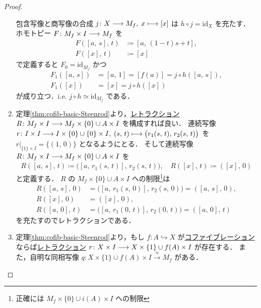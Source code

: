 \documentclass[algtopo_main]{subfiles}
\begin{document}
\begin{proof}
\begin{enumerate}
        包含写像と商写像の合成 $j \colon X \longrightarrow M_f,\; x \longmapsto [x]$ は $h \circ j = \mathrm{id}_X$ を充たす．
        ホモトピー $F \colon M_f \times I \longrightarrow M_f$ を
        \begin{align}
            F([a,\, s],\, t) &\coloneqq [a,\, (1-t)s + t], \\
            F([x],\, t) &\coloneqq [x]
        \end{align}
        で定義すると $F_0 = \mathrm{id}_{M_f}$ かつ
        \begin{align}
            F_1 ([a,\, s]) &= [a,\, 1] = [f(a)] = j \circ h ([a,\, s]), \\
            F_1 ([x]) &= [x] = j \circ h ([x])
        \end{align}
        が成り立つ．i.e. $j \circ h \simeq \mathrm{id}_{M_f}$ である．
        \item 定理\ref{thm:cofib-basic-Steenrod}より，\hyperref[def:retract]{レトラクション} $R \colon M_f \times I \longrightarrow M_f \times \{0\} \cup A \times I$ を構成すれば良い．
        連続写像 $r \colon I \times I \longrightarrow I \times \{0\} \cup \{0\} \times I,\; (s,\, t) \longmapsto \bigl( r_1(s,\, t),\, r_2(s,\, t) \bigr)$ を $r|_{\{1\} \times I} = \{(1,\, 0)\}$ となるようにとる．
        そして連続写像 $R \colon M_f \times I \longrightarrow M_f \times \{0\} \cup A \times I$ を
        \begin{align}
            R([a,\, s],\, t) \coloneqq \bigl([a,\, r_1(s,\, t)],\, r_2(s,\, t) \bigr),\quad R([x],\, t) \coloneqq ([x],\, 0)
        \end{align}
        と定義する．
        $R$ の $M_f \times \{0\} \cup A \times I$ への制限\footnote{正確には $M_f \times \{0\} \cup i(A) \times I$ への制限}は
        \begin{align}
            R([a,\, s],\, 0) &= \bigl([a,\, r_1(s,\, 0)],\, r_2(s,\, 0)\bigr) = ([a,\, s],\, 0),\\ 
            R([x],\, 0) &= ([x],\, 0), \\
            R([a,\, 0],\, t) &= \bigl([a,\, r_1(0,\, t)],\, r_2(0,\, t) \bigr) = ([a,\, 0],\, t)
        \end{align}
        を充たすのでレトラクションである．
        \item 定理\ref{thm:cofib-basic-Steenrod}より，もし $f \colon A \hookrightarrow X$ が\hyperref[def:cofibration]{コファイブレーション}ならば\hyperref[def:retract]{レトラクション}
        $ r\colon X \times I \longrightarrow X \times \{1\} \cup f(A) \times I$ が存在する．
        また，自明な同相写像 $q \colon X \times \{1\} \cup f(A) \times I \xrightarrow{\approx} M_f$ がある．


\end{enumerate}
\end{proof}
\end{document}

